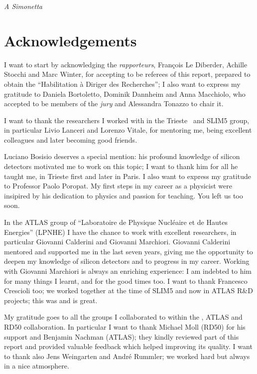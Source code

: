 \vspace*{4cm}
\begin{flushright}
{\itshape A Simonetta
}
\end{flushright}



\chapter*{Acknowledgements}

I want to start by acknowledging the {\it rapporteurs}, Fran\c{c}ois Le Diberder, Achille Stocchi and Marc 
Winter, for accepting 
to be referees of this  report, prepared to obtain the  ``Habilitation \`a Diriger des Recherches''; I 
also want to express my gratitude to Daniela Bortoletto, Dominik Dannheim  and Anna Macchiolo, who 
accepted to be members of the {\it jury} and Alessandra Tonazzo to chair it.

I want to thank the researchers I worked with in the Trieste \babar\ and SLIM5 group, 
in particular Livio Lanceri and Lorenzo Vitale, for mentoring me, being excellent colleagues  
and later becoming good friends. 

\noindent Luciano Bosisio deserves a special mention: his profound knowledge of silicon detectors 
 motivated me to work on this topic; I want to thank him for all he taught me, in Trieste first and later 
 in Paris.
I also want  to express my gratitude to Professor Paolo Poropat. My first steps in
my career as a physicist were insipired by his dedication to physics and passion for teaching. You left us too soon.

In the ATLAS group of ``Laboratoire de Physique Nucl\'eaire et de Hautes Energies'' (LPNHE) I have
the chance to work with excellent researchers, in particular Giovanni Calderini and Giovanni Marchiori. 
Giovanni Calderini mentored and supported me in the last seven years, giving me the opportunity  
to deepen my knowledge of silicon detectors and to progress in my career. 
Working with Giovanni Marchiori is  always an enriching experience: I am indebted to him for 
many things I learnt, and for the good times too. 
I want to thank Francesco Crescioli too; we worked together at the time of SLIM5 and now in 
ATLAS R\&D projects; this was and is great. 

My gratitude goes to all the groups I collaborated to within the \babar, ATLAS and RD50 collaboration. 
In particular I want to thank Michael Moll (RD50) for his support and Benjamin Nachman (ATLAS); 
they kindly reviewed part of this report and provided valuable feedback which helped improving its quality. 
I want to thank also Jens Weingarten and Andr\'e Rummler; we worked hard but always in a nice 
atmosphere.
 


